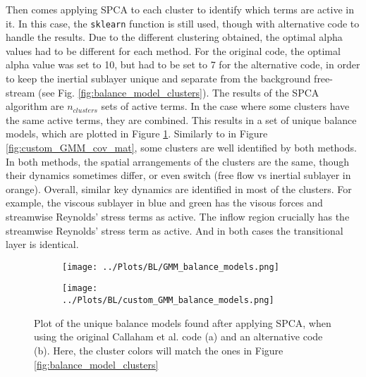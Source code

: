 \documentclass[12pt]{report} %
\begin{document}
\newpage

Then comes applying SPCA to each cluster to identify which terms are active in it. In this case, the \texttt{sklearn} function is still used, though with alternative code to handle the results. Due to the different clustering obtained, the optimal alpha values had to be different for each method. For the original code, the optimal alpha value was set to 10, but had to be set to 7 for the alternative code, in order to keep the inertial sublayer unique and separate from the background free-stream (see Fig. \ref{fig:balance_model_clusters}). The results of the SPCA algorithm are $n_{clusters}$ sets of active terms. In the case where some clusters have the same active terms, they are combined. This results in a set of unique balance models, which are plotted in Figure \ref{fig:balance_models}. Similarly to in Figure \ref{fig:custom_GMM_cov_mat}, some clusters are well identified by both methods. In both methods, the spatial arrangements of the clusters are the same, though their dynamics sometimes differ, or even switch (free flow vs inertial sublayer in orange). Overall, similar key dynamics are identified in most of the clusters. For example, the viscous sublayer in blue and green has the visous forces and streamwise Reynolds' stress terms as active. The inflow region crucially has the streamwise Reynolds' stress term as active. And in both cases the transitional layer is identical.


\begin{figure}[htbp]
  \centering
  \begin{subfigure}[b]{0.45\textwidth}
      \texttt{[image: ../Plots/BL/GMM\_balance\_models.png]}
      \caption{}
  \end{subfigure}
  \hfill
  \begin{subfigure}[b]{0.45\textwidth}
      \texttt{[image: ../Plots/BL/custom\_GMM\_balance\_models.png]}
      \caption{}
  \end{subfigure}
  \caption{Plot of the unique balance models found after applying SPCA, when using the original Callaham et al. code (a) and an alternative code (b). Here, the cluster colors will match the ones in Figure \ref{fig:balance_model_clusters}}
  \label{fig:balance_models}
\end{figure}
\end{document}
